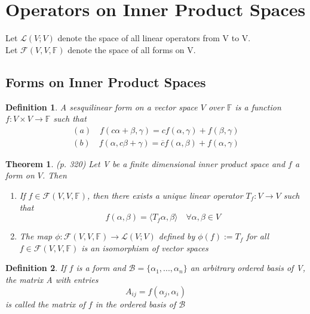 \documentclass{article}
\newcommand{\innerproduct}[1]{\langle#1\rangle}
\newtheorem{theorem}{Theorem}[section]
\newtheorem{definition}{Definition}[section]
\numberwithin{theorem}{subsection} %
\numberwithin{definition}{subsection} %
\numberwithin{proposition}{subsection} %
\begin{document}
\section{Operators on Inner Product Spaces}
Let $\mathcal{L}(V;V)$ denote the space of all linear operators from V to V. \\
Let $\mathcal{F}(V,V,\mathbb{F})$ denote the space of all forms on V. 

\subsection{Forms on Inner Product Spaces}

\begin{definition}
    A sesquilinear form on a vector space $V$ over $\mathbb{F}$ is a function $f: V \times
    V \rightarrow \mathbb{F}$ such that
    \begin{eqnarray*}
        (a) \quad f(c\alpha + \beta, \gamma) = cf(\alpha, \gamma) + f(\beta, \gamma) \\
        (b) \quad f(\alpha, c\beta + \gamma) = \overline{c}f(\alpha, \beta) + f(\alpha, \gamma)
    \end{eqnarray*}
\end{definition}

\begin{theorem}
    (p. 320)
    Let V be a finite dimensional inner product space and $f$ a form on $V$. Then
    \begin{enumerate}
        \item If $f \in \mathcal{F}(V,V,\mathbb{F})$, then there exists a unique linear
            operator $T_f: V \rightarrow V$ such that 
            \begin{equation*}
                f(\alpha, \beta) = \innerproduct{T_f \alpha, \beta} \quad 
                \forall \alpha, \beta \in V
            \end{equation*}
        \item The map $\phi: \mathcal{F}(V,V,\mathbb{F}) \rightarrow \mathcal{L}(V;V)$
            defined by $\phi(f) := T_f$ for all $f \in \mathcal{F}(V,V,\mathbb{F})$ is an
            isomorphism of vector spaces
    \end{enumerate}
\end{theorem}

\begin{definition}
    If $f$ is a form and $\mathcal{B} = \{\alpha_1, ..., \alpha_n\}$ an arbitrary ordered
    basis of V, the matrix A with entries
        \begin{equation*}
            A_{ij} = f(\alpha_j, \alpha_i)
        \end{equation*}
    is called the matrix of $f$ in the ordered basis of $\mathcal{B}$
\end{definition}
\end{document}
